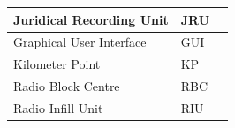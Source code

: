 \documentclass[nocc]{template/openetcs_report}
\begin{document}
\begin{longtable}{|l|l|l|}
				\hline
					\begin{minipage}[t]{0.40\linewidth} Juridical Recording Unit	\end{minipage} 
				&	\begin{minipage}[t]{0.20\linewidth} JRU	\end{minipage} 
				&	\begin{minipage}[t]{0.40\linewidth}  \end{minipage} \\
				
				\hline
					\begin{minipage}[t]{0.40\linewidth} Graphical User Interface	\end{minipage} 
				&	\begin{minipage}[t]{0.20\linewidth} GUI	\end{minipage} 
				&	\begin{minipage}[t]{0.40\linewidth}\end{minipage} \\
				
				\hline
					\begin{minipage}[t]{0.40\linewidth} Kilometer Point	\end{minipage} 
				&	\begin{minipage}[t]{0.20\linewidth} KP\end{minipage} 
				&	\begin{minipage}[t]{0.40\linewidth}\end{minipage} \\
				
				\hline
					\begin{minipage}[t]{0.40\linewidth} Radio Block Centre	\end{minipage} 
				&	\begin{minipage}[t]{0.20\linewidth} RBC\end{minipage} 
				&	\begin{minipage}[t]{0.40\linewidth}\end{minipage} \\
				
				\hline
				\begin{minipage}[t]{0.40\linewidth} Radio Infill Unit	\end{minipage} 
				&	\begin{minipage}[t]{0.20\linewidth} RIU\end{minipage} 
				&	\begin{minipage}[t]{0.40\linewidth}\end{minipage} \\
				

\end{longtable}
\end{document}
